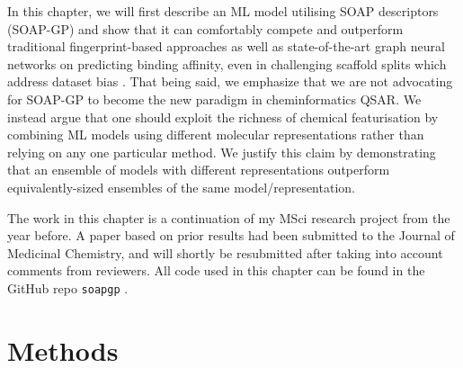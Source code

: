 
In this chapter, we will first describe an ML model utilising SOAP descriptors (SOAP-GP) and show that it can comfortably compete and outperform traditional fingerprint-based approaches as well as state-of-the-art graph neural networks on predicting binding affinity, even in challenging scaffold splits which address dataset bias \cite{wallach2018most,sieg2019need}. That being said, we emphasize that we are not advocating for SOAP-GP to become the new paradigm in cheminformatics QSAR. We instead argue that one should exploit the richness of chemical featurisation by combining ML models using different molecular representations rather than relying on any one particular method. We justify this claim by demonstrating that an ensemble of models with different representations outperform equivalently-sized ensembles of the same model/representation.

The work in this chapter is a continuation of my MSci research project from the year before. A paper based on prior results had been submitted to the Journal of Medicinal Chemistry, and will shortly be resubmitted after taking into account comments from reviewers. All code used in this chapter can be found in the GitHub repo \texttt{soapgp}  \cite{McCorkindale2020SOAPGP}.

\section{Methods}\label{sec:experiment}

